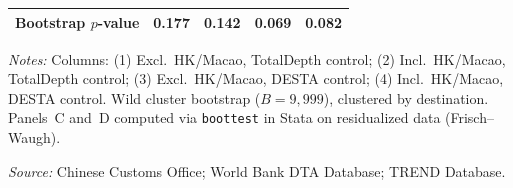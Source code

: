 \begin{table}[htbp]
\begin{threeparttable}
\begin{tabular}{lcccc}
\quad Bootstrap $p$-value & 0.177 & 0.142 & 0.069 & 0.082 \\
\bottomrule
\end{tabular}
\begin{tablenotes}[flushleft]\footnotesize
\item \emph{Notes:} Columns: (1) Excl.\ HK/Macao, TotalDepth control; (2) Incl.\ HK/Macao, TotalDepth control; (3) Excl.\ HK/Macao, DESTA control; (4) Incl.\ HK/Macao, DESTA control. Wild cluster bootstrap ($B = 9{,}999$), clustered by destination. Panels~C and~D computed via \texttt{boottest} in Stata on residualized data (Frisch--Waugh).
\item \textit{Source:} Chinese Customs Office; World Bank DTA Database; TREND Database.
\end{tablenotes}
\end{threeparttable}
\end{table}
